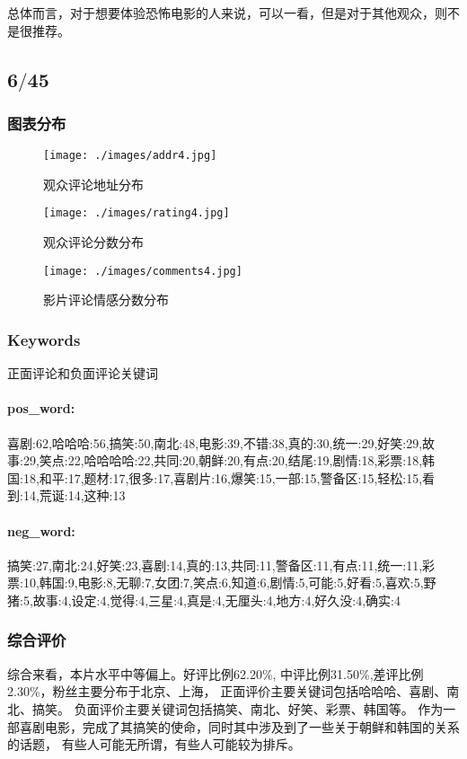 \documentclass[12pt]{article}
\begin{document}
总体而言，对于想要体验恐怖电影的人来说，可以一看，但是对于其他观众，则不是很推荐。

\subsection*{6$/$45}
\subsubsection*{图表分布}
\begin{figure}[H]
    \centering
    \begin{minipage}[t]{0.48\textwidth}
    \centering
    \texttt{[image: ./images/addr4.jpg]}
    \caption{观众评论地址分布}
    \end{minipage}
    \begin{minipage}[t]{0.48\textwidth}
    \centering
    \texttt{[image: ./images/rating4.jpg]}
    \caption{观众评论分数分布}
    \end{minipage}
\end{figure}
\begin{figure}[H]
    \centering
    \texttt{[image: ./images/comments4.jpg]}
    \caption{影片评论情感分数分布} 
\end{figure}
\subsubsection*{Keywords}
正面评论和负面评论关键词
\paragraph*{pos\_word:}
喜剧:62,哈哈哈:56,搞笑:50,南北:48,电影:39,不错:38,真的:30,统一:29,好笑:29,故事:29,笑点:22,哈哈哈哈:22,共同:20,朝鲜:20,有点:20,结尾:19,剧情:18,彩票:18,韩国:18,和平:17,题材:17,很多:17,喜剧片:16,爆笑:15,一部:15,警备区:15,轻松:15,看到:14,荒诞:14,这种:13
\paragraph*{neg\_word:}
搞笑:27,南北:24,好笑:23,喜剧:14,真的:13,共同:11,警备区:11,有点:11,统一:11,彩票:10,韩国:9,电影:8,无聊:7,女团:7,笑点:6,知道:6,剧情:5,可能:5,好看:5,喜欢:5,野猪:5,故事:4,设定:4,觉得:4,三星:4,真是:4,无厘头:4,地方:4,好久没:4,确实:4
\subsubsection*{综合评价}
综合来看，本片水平中等偏上。好评比例62.20\%,
中评比例31.50\%,差评比例2.30\%，粉丝主要分布于北京、上海，
正面评价主要关键词包括哈哈哈、喜剧、南北、搞笑。
负面评价主要关键词包括搞笑、南北、好笑、彩票、韩国等。
作为一部喜剧电影，完成了其搞笑的使命，同时其中涉及到了一些关于朝鲜和韩国的关系的话题，
有些人可能无所谓，有些人可能较为排斥。
\end{document}
